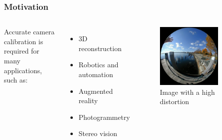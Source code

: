 \documentclass{beamer}
\begin{document}
\begin{frame}
	\frametitle{Motivation}

	\begin{columns}[T,onlytextwidth]
		Accurate camera calibration is required for many applications, such as:
		\begin{itemize}
			\item 3D reconstruction
			\item Robotics and automation
			\item Augmented reality
			\item Photogrammetry
			\item Stereo vision
		\end{itemize}

		\begin{figure}
			\centering
			\includegraphics[width=0.8\textwidth]{high_distortion.png}
			\caption{Image with a high distortion}
		\end{figure}
	\end{columns}
\end{frame}
\end{document}
